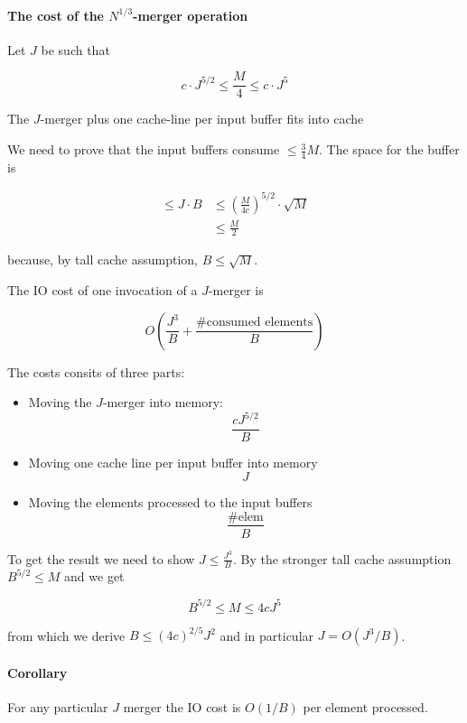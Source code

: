 \paragraph{The cost of the $N^{1/3}$-merger operation} Let $J$ be such that 

\[c\cdot J^{5/2} \leq \frac M4 \leq c\cdot J^5\]

\begin{lem} The $J$-merger plus one cache-line per input buffer fits into cache
\end{lem}

\begin{pr} We need to prove that the input buffers consume $\leq \frac 34 M$. The space for the buffer is

\begin{align*}
\leq J\cdot B &\leq (\frac{M}{4c})^{5/2}\cdot \sqrt{M}\\
	&\leq \frac M2
\end{align*}

because, by tall cache assumption, $B\leq \sqrt M$.
\end{pr}

\begin{lem} The IO cost of one invocation of a $J$-merger is 

\[O(\frac{J^3}{B} + \frac{\text{\# consumed elements}}{B})\]
\end{lem}

\begin{pr} The costs consits of three parts:
\begin{itemize}
\item Moving the $J$-merger into memory: \[\frac{cJ^{5/2}}{B}\]
\item Moving one cache line per input buffer into memory \[J\]
\item Moving the elements processed to the input buffers \[\frac{\text{\# elem}}{B}\]
\end{itemize}

To get the result we need to show $J \leq \frac{J^3}{B}$. By the stronger tall cache assumption $B^{5/2}\leq M$ and we get

\[B^{5/2} \leq M \leq 4cJ^5\]

from which we derive $B\leq (4c)^{2/5} J^2$ and in particular $J=O(J^3/B)$.
\end{pr}

\paragraph{Corollary} For any particular $J$ merger the IO cost is $O(1/B)$ per element processed. 


